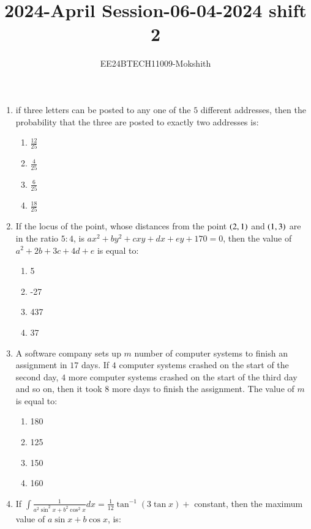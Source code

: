 \documentclass[journal]{IEEEtran}
\begin{document}

\title{2024-April Session-06-04-2024 shift 2}
\author{EE24BTECH11009-Mokshith}
{\let\newpage\relax\maketitle}
\renewcommand{\thefigure}{\theenumi}
\renewcommand{\thetable}{\theenumi}
\setlength{\intextsep}{10pt} %
\renewcommand{\thetable}{\theenumi}
\begin{enumerate}[start=16]
\item if three letters can be posted to any one of the $5 $ different addresses, then the probability that the three are posted to exactly two addresses is:
    \begin{enumerate}
    \item $\frac{12}{25}$
    \item $\frac{4}{25}$
    \item $\frac{6}{25}$
    \item $\frac{18}{25}$
\end{enumerate}
\item If the locus of the point, whose distances from the point $\left(2, 1\right)$ and $\left(1, 3\right)$ are in the ratio $5: 4$, is
$ax^2+by^2+cxy+dx+ey+170=0$, then the value of $a^2+2b+3c+4d+e$ is equal to:
\begin{enumerate}
\item 5
\item -27
\item 437
\item 37
\end{enumerate}
\item A software company sets up $m$ number of computer systems to finish an assignment in $17$ days. If
$4$ computer systems crashed on the start of the second day, $4$ more computer systems crashed on
the start of the third day and so on, then it took $8$ more days to finish the assignment. The value of
$m$ is equal to:
\begin{enumerate}
\item 180
\item 125
\item 150
\item 160
\end{enumerate}
\item If $\int\frac{1}{a^{2}\sin^{2}x+b^{2}\cos^{2}x}dx=\frac{1}{12}\tan^{-1}(3\tan x)+$ constant, then the maximum value of $a\sin x+b\cos x$, is:


\end{enumerate}
\end{document}
